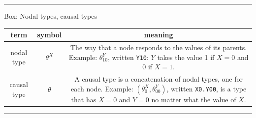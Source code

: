 \documentclass[
  12pt,
]{book}
\begin{document}
\begin{center}\rule{0.5\linewidth}{0.5pt}\end{center}

Box: Nodal types, causal types

\begin{longtable}[]{@{}ccc@{}}
\toprule
\begin{minipage}[b]{0.20\columnwidth}\centering
\textbf{term}\strut
\end{minipage} & \begin{minipage}[b]{0.15\columnwidth}\centering
\textbf{symbol}\strut
\end{minipage} & \begin{minipage}[b]{0.57\columnwidth}\centering
\textbf{meaning}\strut
\end{minipage}\tabularnewline
\midrule
\endhead
\begin{minipage}[t]{0.20\columnwidth}\centering
nodal type\strut
\end{minipage} & \begin{minipage}[t]{0.15\columnwidth}\centering
\(\theta^X\)\strut
\end{minipage} & \begin{minipage}[t]{0.57\columnwidth}\centering
The way that a node responds to the values of its parents. Example: \(\theta^Y_{10}\), written \texttt{Y10}: \(Y\) takes the value 1 if \(X=0\) and 0 if \(X=1\).\strut
\end{minipage}\tabularnewline
\begin{minipage}[t]{0.20\columnwidth}\centering
causal type\strut
\end{minipage} & \begin{minipage}[t]{0.15\columnwidth}\centering
\(\theta\)\strut
\end{minipage} & \begin{minipage}[t]{0.57\columnwidth}\centering
A causal type is a concatenation of nodal types, one for each node. Example: \((\theta^X_0, \theta^Y_{00})\), written \texttt{X0.Y00}, is a type that has \(X=0\) and \(Y=0\) no matter what the value of \(X\).\strut
\end{minipage}\tabularnewline
\bottomrule
\end{longtable}

\begin{center}\rule{0.5\linewidth}{0.5pt}\end{center}
\end{document}
